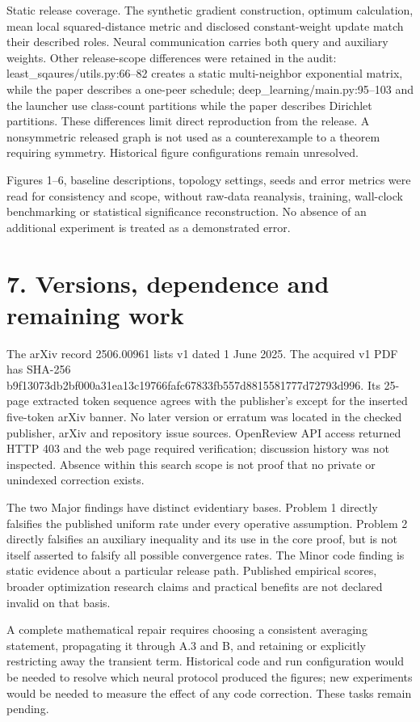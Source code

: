 \documentclass[10pt]{article}
\begin{document}
Static release coverage. The synthetic gradient construction, optimum calculation, mean local squared-distance metric and disclosed constant-weight update match their described roles. Neural communication carries both query and auxiliary weights. Other release-scope differences were retained in the audit: least\_sqaures/utils.py:66–82 creates a static multi-neighbor exponential matrix, while the paper describes a one-peer schedule; deep\_learning/main.py:95–103 and the launcher use class-count partitions while the paper describes Dirichlet partitions. These differences limit direct reproduction from the release. A nonsymmetric released graph is not used as a counterexample to a theorem requiring symmetry. Historical figure configurations remain unresolved.\par
Figures 1–6, baseline descriptions, topology settings, seeds and error metrics were read for consistency and scope, without raw-data reanalysis, training, wall-clock benchmarking or statistical significance reconstruction. No absence of an additional experiment is treated as a demonstrated error.\par
\section*{7. Versions, dependence and remaining work}
The arXiv record 2506.00961 lists v1 dated 1 June 2025. The acquired v1 PDF has SHA-256 b9f13073db2bf000a31ea13c19766fafc67833fb557d8815581777d72793d996. Its 25-page extracted token sequence agrees with the publisher’s except for the inserted five-token arXiv banner. No later version or erratum was located in the checked publisher, arXiv and repository issue sources. OpenReview API access returned HTTP 403 and the web page required verification; discussion history was not inspected. Absence within this search scope is not proof that no private or unindexed correction exists.\par
The two Major findings have distinct evidentiary bases. Problem 1 directly falsifies the published uniform rate under every operative assumption. Problem 2 directly falsifies an auxiliary inequality and its use in the core proof, but is not itself asserted to falsify all possible convergence rates. The Minor code finding is static evidence about a particular release path. Published empirical scores, broader optimization research claims and practical benefits are not declared invalid on that basis.\par
A complete mathematical repair requires choosing a consistent averaging statement, propagating it through A.3 and B, and retaining or explicitly restricting away the transient term. Historical code and run configuration would be needed to resolve which neural protocol produced the figures; new experiments would be needed to measure the effect of any code correction. These tasks remain pending.\par
\end{document}
